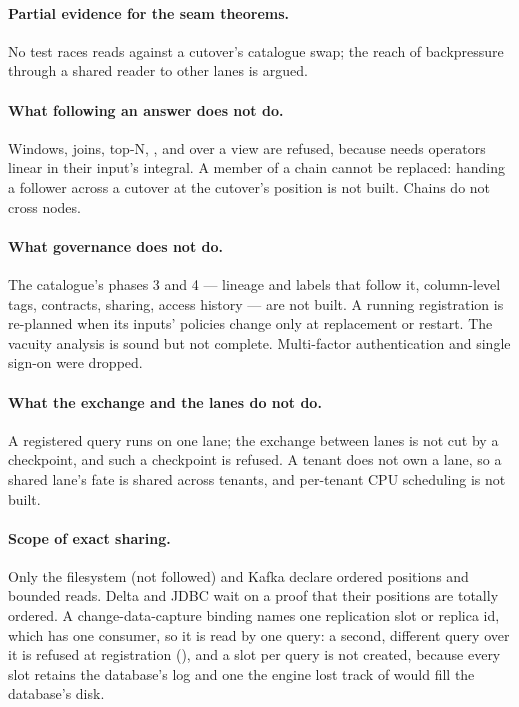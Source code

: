 \documentclass[11pt,a4paper]{article}
\renewcommand{\_}{\oldunderscore\allowbreak}
\newcommand{\code}[1]{\texttt{\pvbreakable{#1}}}
\begin{document}
\paragraph{Partial evidence for the seam theorems.} No test races reads against a cutover's catalogue
swap; the reach of backpressure through a shared reader to other lanes is argued.

\paragraph{What following an answer does not do.} Windows, joins, top-N, \code{MIN}, \code{MAX} and
\code{COUNT(DISTINCT)} over a view are refused, because  needs operators linear in their
input's integral. A member of a chain cannot be replaced: handing a follower across a cutover at the
cutover's position is not built. Chains do not cross nodes.

\paragraph{What governance does not do.} The catalogue's phases 3 and 4 --- lineage and labels that
follow it, column-level tags, contracts, sharing, access history --- are not built. A running
registration is re-planned when its inputs' policies change only at replacement or restart. The vacuity
analysis is sound but not complete. Multi-factor authentication and single sign-on were dropped.

\paragraph{What the exchange and the lanes do not do.} A registered query runs on one lane; the exchange
between lanes is not cut by a checkpoint, and such a checkpoint is refused. A tenant does not own a lane,
so a shared lane's fate is shared across tenants, and per-tenant CPU scheduling is not built.

\paragraph{Scope of exact sharing.} Only the filesystem (not followed) and Kafka declare ordered
positions and bounded reads. Delta and JDBC wait on a proof that their positions are totally ordered.
A change-data-capture binding names one replication slot or replica id, which has one consumer, so it is
read by one query: a second, different query over it is refused at registration (\code{PRV-8028}), and a
slot per query is not created, because every slot retains the database's log and one the engine lost
track of would fill the database's disk.
\end{document}
